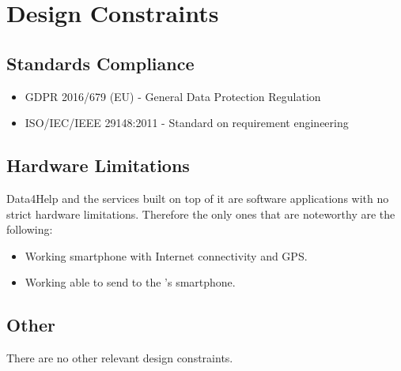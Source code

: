 \documentclass[../../rasd.tex]{subfiles}
\begin{document}
\section{Design Constraints}
			\subsection{Standards Compliance}
				\begin{itemize}
					\item GDPR 2016/679 (EU) - General Data Protection Regulation
					\item ISO/IEC/IEEE 29148:2011 - Standard on requirement engineering
				\end{itemize}
			\subsection{Hardware Limitations}
				Data4Help and the services built on top of it are software applications with no strict hardware limitations. Therefore the only ones that are noteworthy are the following:
				\begin{itemize}
					\item Working smartphone with Internet connectivity and GPS.
					\item Working  able to send  to the 's smartphone.
				\end{itemize}				
			\subsection{Other}
			There are no other relevant design constraints.
\end{document}
